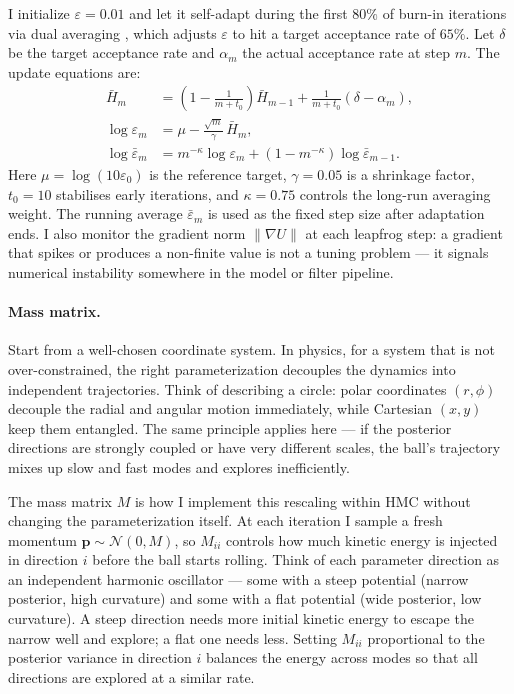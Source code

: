 \documentclass{article}
\renewcommand{\v}[1]{ \ensuremath{ {\mathbf{#1}} }}
\begin{document}
I initialize $\varepsilon = 0.01$ and let it self-adapt during the first $80\%$ of burn-in iterations via dual averaging \cite{hoffman2014nuts}, which adjusts $\varepsilon$ to hit a target acceptance rate of $65\%$. Let $\delta$ be the target acceptance rate and $\alpha_m$ the actual acceptance rate at step $m$. The update equations are:
\begin{align}
\bar{H}_m &= \left(1 - \frac{1}{m + t_0}\right)\bar{H}_{m-1} + \frac{1}{m + t_0}(\delta - \alpha_m), \\
\log \varepsilon_m &= \mu - \frac{\sqrt{m}}{\gamma}\,\bar{H}_m, \\
\log \bar{\varepsilon}_m &= m^{-\kappa}\log \varepsilon_m + (1 - m^{-\kappa})\log \bar{\varepsilon}_{m-1}.
\end{align}
Here $\mu = \log(10\varepsilon_0)$ is the reference target, $\gamma = 0.05$ is a shrinkage factor, $t_0 = 10$ stabilises early iterations, and $\kappa = 0.75$ controls the long-run averaging weight. The running average $\bar{\varepsilon}_m$ is used as the fixed step size after adaptation ends. I also monitor the gradient norm $\|\nabla U\|$ at each leapfrog step: a gradient that spikes or produces a non-finite value is not a tuning problem --- it signals numerical instability somewhere in the model or filter pipeline.

\paragraph{Mass matrix.}
Start from a well-chosen coordinate system. In physics, for a system that is not over-constrained, the right parameterization decouples the dynamics into independent trajectories. Think of describing a circle: polar coordinates $(r,\phi)$ decouple the radial and angular motion immediately, while Cartesian $(x,y)$ keep them entangled. The same principle applies here — if the posterior directions are strongly coupled or have very different scales, the ball's trajectory mixes up slow and fast modes and explores inefficiently.

The mass matrix $M$ is how I implement this rescaling within HMC without changing the parameterization itself. At each iteration I sample a fresh momentum $\v p \sim \mathcal{N}(0, M)$, so $M_{ii}$ controls how much kinetic energy is injected in direction $i$ before the ball starts rolling. Think of each parameter direction as an independent harmonic oscillator — some with a steep potential (narrow posterior, high curvature) and some with a flat potential (wide posterior, low curvature). A steep direction needs more initial kinetic energy to escape the narrow well and explore; a flat one needs less. Setting $M_{ii}$ proportional to the posterior variance in direction $i$ balances the energy across modes so that all directions are explored at a similar rate.
\end{document}

